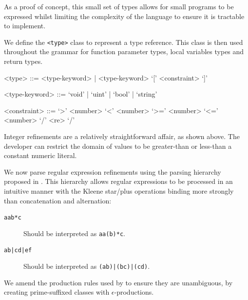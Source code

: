 \documentclass[a4paper,openany,12pt]{book}
\begin{document}
As a proof of concept, this small set of types allows for small programs to be expressed whilst limiting the complexity
of the language to ensure it is tractable to implement.

We define the \texttt{<type>} class to represent a type reference.
This class is then used throughout the grammar for function parameter types, local variables types and return
types.

\begin{grammar}
    <type> ::= <type-keyword> | <type-keyword> `[' <constraint> `]'

    <type-keyword> ::= `void' | `uint' | `bool' | `string'

    <constraint> ::= `>' <number> \alt `<' <number> \alt `>=' <number> \alt `<=' <number> \alt `/' <re> `/'
\end{grammar}

Integer refinements are a relatively straightforward affair, as shown above.
The developer can restrict the domain of values to be greater-than or less-than a constant numeric literal.

We now parse regular expression refinements using the parsing hierarchy proposed in \citet{cameron1999}.
This hierarchy allows regular expressions to be processed in an intuitive manner with the Kleene star/plus operations
binding more strongly than concatenation and alternation:

\begin{description}
    \item[\texttt{aab*c}] Should be interpreted as \texttt{aa(b)*c}.
    \item[\texttt{ab|cd|ef}] Should be interpreted as \texttt{(ab)|(bc)|(cd)}.
\end{description}

We amend the production rules used by \citeauthor{cameron1999} to ensure they are unambiguous, by creating
prime-suffixed classes with $\epsilon$-productions.
\end{document}
